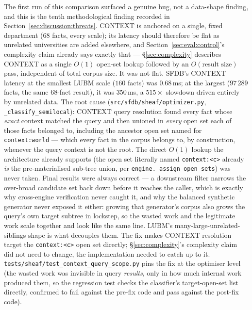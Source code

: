 The first run of this comparison surfaced a genuine bug, not a data-shape
finding, and this is the tenth methodological finding recorded in
Section~\ref{sec:discussion:threats}. CONTEXT is anchored on a single,
fixed department ($68$ facts, every scale); its latency should therefore
be flat as unrelated universities are added elsewhere, and
Section~\ref{sec:eval:control}'s complexity claim already says exactly
that --- \S\ref{sec:complexity} describes CONTEXT as a single $O(1)$
open-set lookup followed by an $O(\text{result size})$ pass, independent
of total corpus size. It was not flat. SFDB's CONTEXT latency at the
smallest LUBM scale ($160$ facts) was $0.68$\,ms; at the largest
($97\,289$ facts, the same $68$-fact result), it was $350$\,ms, a
$515\times$ slowdown driven entirely by unrelated data. The root cause
(\texttt{src/sfdb/sheaf/optimizer.py}, \texttt{\_classify\_semilocal}):
CONTEXT query resolution found every fact whose \emph{exact} context
matched the query and then unioned in \emph{every} open set each of
those facts belonged to, including the ancestor open set named for
\texttt{context:world} --- which every fact in the corpus belongs to,
by construction, whenever the query context is not the root. The direct
$O(1)$ lookup the architecture already supports (the open set literally
named \texttt{context:<c>} already \emph{is} the pre-materialised
sub-tree union, per \texttt{engine.\_assign\_open\_sets}) was never
taken. Final results were always correct --- a downstream filter narrows
the over-broad candidate set back down before it reaches the caller,
which is exactly why cross-engine verification never caught it, and why
the balanced synthetic generator never exposed it either: growing that
generator's corpus also grows the query's own target subtree in
lockstep, so the wasted work and the legitimate work scale together and
look like the same line. LUBM's many-large-unrelated-siblings shape is
what decouples them. The fix makes CONTEXT resolution target the
\texttt{context:<c>} open set directly; \S\ref{sec:complexity}'s
complexity claim did not need to change, the implementation needed to
catch up to it. \texttt{tests/sheaf/test\_context\_query\_scope.py} pins
the fix at the optimiser level (the wasted work was invisible in query
\emph{results}, only in how much internal work produced them, so the
regression test checks the classifier's target-open-set list directly,
confirmed to fail against the pre-fix code and pass against the
post-fix code).

